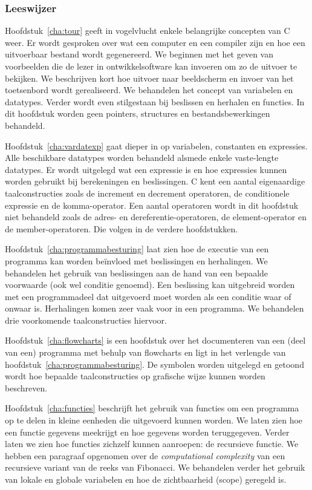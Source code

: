 \subsubsection*{Leeswijzer}
Hoofdstuk~\ref{cha:tour} geeft in vogelvlucht enkele belangrijke concepten van  C weer. Er wordt gesproken over wat een computer en een compiler zijn en hoe een uitvoerbaar bestand wordt gegenereerd. We beginnen met het geven van voorbeelden die de lezer in ontwikkelsoftware kan invoeren om zo de uitvoer te bekijken. We beschrijven kort hoe uitvoer naar beeldscherm en invoer van het toetsenbord wordt gerealiseerd. We behandelen het concept van variabelen en datatypes. Verder wordt even stilgestaan bij beslissen en herhalen en functies. In dit hoofdstuk worden geen pointers, structures en bestandsbewerkingen behandeld.

Hoofdstuk~\ref{cha:vardatexp} gaat dieper in op variabelen, constanten en expressies. Alle beschikbare datatypes worden behandeld alsmede enkele vaste-lengte datatypes. Er wordt uitgelegd wat een expressie is en hoe expressies kunnen worden gebruikt bij berekeningen en beslissingen. C kent een aantal eigenaardige taalconstructies zoals de increment en decrement operatoren, de conditionele expressie en de komma-operator. Een aantal operatoren wordt in dit hoofdstuk niet behandeld zoals de adres- en dereferentie-operatoren, de element-operator en de member-operatoren. Die volgen in de verdere hoofdstukken.

Hoofdstuk~\ref{cha:programmabesturing} laat zien hoe de executie van een programma kan worden beïnvloed met beslissingen en herhalingen. We behandelen het gebruik van beslissingen aan de hand van een bepaalde voorwaarde (ook wel conditie genoemd). Een beslissing kan uitgebreid worden met een programmadeel dat uitgevoerd moet worden als een conditie waar of onwaar is. Herhalingen komen zeer vaak voor in een programma. We behandelen drie voorkomende taalconstructies hiervoor.

Hoofdstuk~\ref{cha:flowcharts} is een hoofdstuk over het documenteren van een (deel van een) programma met behulp van flowcharts en ligt in het verlengde van hoofdstuk~\ref{cha:programmabesturing}. De symbolen worden uitgelegd en
getoond wordt hoe bepaalde taalconstructies op grafische wijze kunnen worden beschreven.

Hoofdstuk~\ref{cha:functies} beschrijft het gebruik van functies om een programma op te delen in kleine eenheden die uitgevoerd kunnen worden. We laten zien hoe een functie gegevens meekrijgt en hoe gegevens worden teruggegeven. Verder laten we zien hoe functies zichzelf kunnen aanroepen: de recursieve functie. We hebben een paragraaf opgenomen over de \textsl{computational complexity} van een recursieve variant van de reeks van Fibonacci. We behandelen verder het gebruik van lokale en globale variabelen en hoe de zichtbaarheid (scope) geregeld is.

